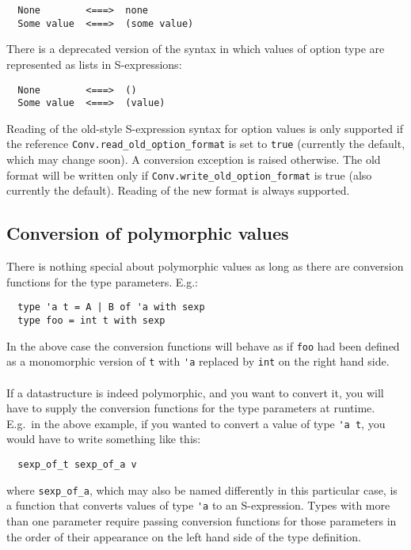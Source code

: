 \documentclass[a4paper]{article}
\begin{document}
\begin{verbatim}
  None        <===>  none
  Some value  <===>  (some value)
\end{verbatim}

There is a deprecated version of the syntax in which values of option
type are represented as lists in S-expressions:

\begin{verbatim}
  None        <===>  ()
  Some value  <===>  (value)
\end{verbatim}

Reading of the old-style S-expression syntax for option values is only
supported if the reference \verb=Conv.read_old_option_format= is set to
\verb=true= (currently the default, which may change soon).  A conversion
exception is raised otherwise.  The old format will be written only if
\verb=Conv.write_old_option_format= is true (also currently the default).
Reading of the new format is always supported.

\subsection{Conversion of polymorphic values}

There is nothing special about polymorphic values as long as there are
conversion functions for the type parameters.  E.g.:

\begin{verbatim}
  type 'a t = A | B of 'a with sexp
  type foo = int t with sexp
\end{verbatim}

In the above case the conversion functions will behave as if \verb=foo=
had been defined as a monomorphic version of \verb=t= with \verb='a=
replaced by \verb=int= on the right hand side.\\
\\
If a datastructure is indeed polymorphic, and you want to convert it,
you will have to supply the conversion functions for the type parameters
at runtime.  E.g.\ in the above example, if you wanted to convert a value
of type \verb='a t=, you would have to write something like this:

\begin{verbatim}
  sexp_of_t sexp_of_a v
\end{verbatim}

\noindent where \verb=sexp_of_a=, which may also be named differently in
this particular case, is a function that converts values of type \verb='a=
to an S-expression.  Types with more than one parameter require passing
conversion functions for those parameters in the order of their appearance
on the left hand side of the type definition.
\end{document}
